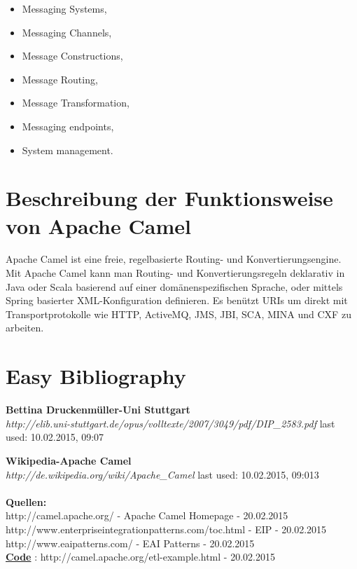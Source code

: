 \documentclass[12pt]{article}
\begin{document}
\begin{itemize}
\item Messaging Systems,
\item Messaging Channels,
\item Message Constructions,
\item Message Routing,
\item Message Transformation,
\item Messaging endpoints,
\item System management.
\end{itemize}

\section{Beschreibung der Funktionsweise von Apache Camel}

Apache Camel ist eine freie, regelbasierte Routing- und Konvertierungsengine. Mit Apache Camel kann man Routing- und Konvertierungsregeln deklarativ in Java oder Scala basierend auf einer domänenspezifischen Sprache, oder mittels Spring basierter XML-Konfiguration definieren.\cite{CamelWiki} Es benützt URIs um direkt mit Transportprotokolle wie  HTTP, ActiveMQ, JMS, JBI, SCA, MINA und CXF zu arbeiten.

\section{Easy Bibliography}

\listoftables
\listoffigures
\printglossaries

\begin{thebibliography}{56}

   \textbf{Bettina Druckenmüller-Uni Stuttgart}\\
  \textit{http://elib.uni-stuttgart.de/opus/volltexte/2007/3049/pdf/DIP\_2583.pdf}
  \newline last used: 10.02.2015, 09:07

   \textbf{Wikipedia-Apache Camel}\\
  \textit{http://de.wikipedia.org/wiki/Apache\_Camel}
  \newline last used: 10.02.2015, 09:013
 \\\\
 \textbf{Quellen:}\\
 http://camel.apache.org/ - Apache Camel Homepage - 20.02.2015 \\
 http://www.enterpriseintegrationpatterns.com/toc.html - EIP - 20.02.2015 \\
 http://www.eaipatterns.com/ - EAI Patterns - 20.02.2015 \\
 \underline{\textbf{Code}} : http://camel.apache.org/etl-example.html - 20.02.2015 
 
 
\end{thebibliography}
\end{document}
